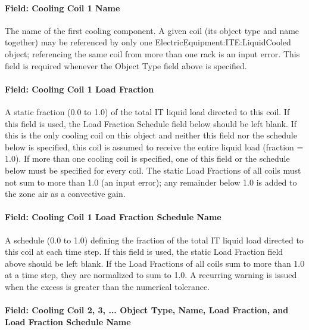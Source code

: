 \paragraph{Field: Cooling Coil 1 Name}\label{field-cooling-coil-1-name-iteliquidcooled}

The name of the first cooling component. A given coil (its object type and name together) may be referenced by only one ElectricEquipment:ITE:LiquidCooled object; referencing the same coil from more than one rack is an input error. This field is required whenever the Object Type field above is specified.

\paragraph{Field: Cooling Coil 1 Load Fraction}\label{field-cooling-coil-1-load-fraction-iteliquidcooled}

A static fraction (0.0 to 1.0) of the total IT liquid load directed to this coil. If this field is used, the Load Fraction Schedule field below should be left blank. If this is the only cooling coil on this object and neither this field nor the schedule below is specified, this coil is assumed to receive the entire liquid load (fraction = 1.0). If more than one cooling coil is specified, one of this field or the schedule below must be specified for every coil. The static Load Fractions of all coils must not sum to more than 1.0 (an input error); any remainder below 1.0 is added to the zone air as a convective gain.

\paragraph{Field: Cooling Coil 1 Load Fraction Schedule Name}\label{field-cooling-coil-1-load-fraction-schedule-name-iteliquidcooled}

A schedule (0.0 to 1.0) defining the fraction of the total IT liquid load directed to this coil at each time step. If this field is used, the static Load Fraction field above should be left blank. If the Load Fractions of all coils sum to more than 1.0 at a time step, they are normalized to sum to 1.0. A recurring warning is issued when the excess is greater than the numerical tolerance.

\paragraph{Field: Cooling Coil 2, 3, ... Object Type, Name, Load Fraction, and Load Fraction Schedule Name}\label{field-cooling-coil-n-iteliquidcooled}

